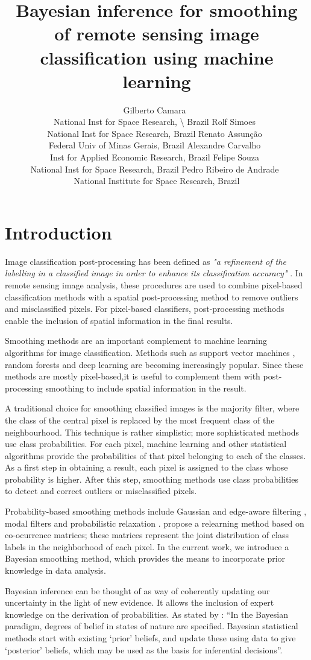\documentclass[
]{jss}
\author{
Gilberto Camara~\orcidlink{0000-0002-3681-487X}\\National Inst for Space Research, \textbackslash{} Brazil \And Rolf Simoes~\orcidlink{0000-0003-0953-4132}\\National Inst for Space Research, Brazil \And Renato Assunção~\orcidlink{0000-0001-7442-9166}\\Federal Univ of Minas Gerais, Brazil \AND Alexandre Carvalho~\orcidlink{0000-0001-8762-5465}\\Inst for Applied Economic Research, Brazil \And Felipe Souza~\orcidlink{0000-XXXXX}\\National Inst for Space Research, Brazil \And Pedro Ribeiro de Andrade~\orcidlink{0000-XXXXX}\\National Institute for Space Research, Brazil
}
\title{Bayesian inference for smoothing of remote sensing image classification using machine learning}
\begin{document}
\newpage

\hypertarget{introduction}{%
\section{Introduction}\label{introduction}}

Image classification post-processing has been defined as \textit{"a refinement of the
labelling in a classified image in order to enhance its classification accuracy"}
\citep{Huang2014}. In remote sensing image analysis, these procedures are used
to combine pixel-based classification methods with a spatial post-processing
method to remove outliers and misclassified pixels. For pixel-based classifiers,
post-processing methods enable the inclusion of spatial information
in the final results.

Smoothing methods are an important complement to machine learning algorithms
for image classification. Methods such as support vector machines
\citep{Mountrakis2011}, random forests \citep{Belgiu2016} and
deep learning \citep{Ma2019} are becoming increasingly popular. Since these methods
are mostly pixel-based,it is useful to complement them with post-processing smoothing
to include spatial information in the result.

A traditional choice for smoothing classified images is the majority filter,
where the class of the central pixel is replaced by the most frequent class of
the neighbourhood. This technique is rather simplistic; more sophisticated methods
use class probabilities. For each pixel, machine learning and other statistical
algorithms provide the probabilities of that pixel belonging to each of the classes.
As a first step in obtaining a result, each pixel is assigned to the class whose
probability is higher. After this step, smoothing methods use class probabilities
to detect and correct outliers or misclassified pixels.

Probability-based smoothing methods include Gaussian and edge-aware filtering \citep{Schindler2012}, modal filters \citep{Ghimire2010} and probabilistic relaxation
\citep{Gong1989}. \citet{Huang2014} propose a relearning method based on co-ocurrence
matrices; these matrices represent the joint distribution of class labels in the
neighborhood of each pixel. In the current work, we introduce a Bayesian smoothing method,
which provides the means to incorporate prior knowledge in data analysis.

Bayesian inference can be thought of as way of coherently updating our uncertainty in the
light of new evidence. It allows the inclusion of expert knowledge on the derivation of
probabilities. As stated by \citet{Spiegelhalter2009}: ``In the Bayesian paradigm, degrees
of belief in states of nature are specified. Bayesian statistical methods start with
existing `prior' beliefs, and update these using data to give `posterior' beliefs,
which may be used as the basis for inferential decisions''.
\end{document}
